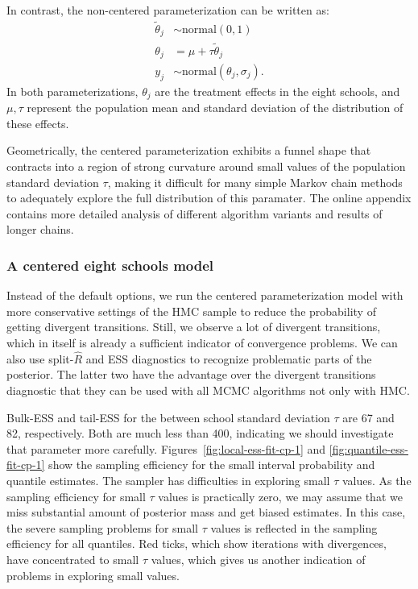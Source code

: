 \documentclass[american,]{article}
\theoremstyle{definition}
\begin{document}
In contrast, the non-centered parameterization can be written as:
\begin{align*}
\tilde{\theta}_j &\sim \text{normal}(0, 1) \\
\theta_j &= \mu + \tau \tilde{\theta}_j \\
y_j &\sim \text{normal}(\theta_j, \sigma_j).
\end{align*}
In both parameterizations, $\theta_j$ are the treatment effects in the eight schools,
and $\mu, \tau$ represent the population mean and standard deviation 
of the distribution of these effects.

Geometrically, the centered parameterization exhibits a funnel shape
that contracts into a region of strong curvature around small
values of the population standard deviation $\tau$, making it difficult for many simple
Markov chain methods to adequately explore the full distribution of this
paramater. The online appendix contains more detailed analysis of different 
algorithm variants and results of longer chains.

\hypertarget{a-centered-eight-schools-model}{%
\subsubsection*{A centered eight schools
model}\label{a-centered-eight-schools-model}}

Instead of the default options, we run the centered parameterization
model with more conservative settings of the HMC sample to reduce the
probability of getting divergent transitions. Still, we observe a lot of divergent
transitions, which in itself is already a sufficient indicator of
convergence problems. We can also use split-\(\widehat{R}\) and ESS
diagnostics to recognize problematic parts of the posterior. The latter
two have the advantage over the divergent transitions diagnostic that they
can be used with all MCMC algorithms not only with HMC.

Bulk-ESS and tail-ESS for the between school standard deviation $\tau$
are 67 and 82, respectively. Both are much less than 400, indicating we
should investigate that parameter more carefully.
Figures~\ref{fig:local-ess-fit-cp-1} and
\ref{fig:quantile-ess-fit-cp-1} show the sampling efficiency for the
small interval probability and quantile estimates.
The sampler has difficulties in exploring small $\tau$ values. As the
sampling efficiency for small $\tau$ values is practically zero, we
may assume that we miss substantial amount of posterior mass and
get biased estimates. In this case, the severe sampling problems for
small $\tau$ values is reflected in the sampling efficiency for all
quantiles. Red ticks, which show iterations with divergences, have
concentrated to small $\tau$ values, which gives us another indication
of problems in exploring small values.
\end{document}
